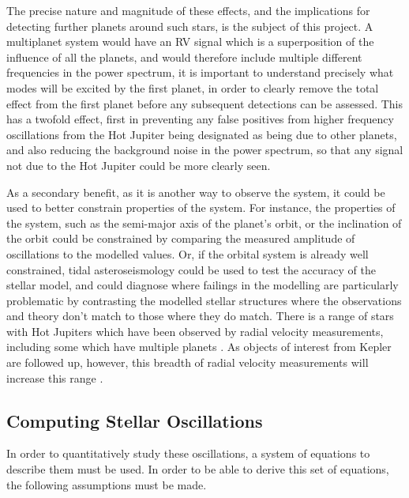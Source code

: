 \documentclass[11pt]{amsart}
\begin{document}
The precise nature and magnitude of these effects, and the implications for detecting further planets around such stars, is the subject of this project.  A multiplanet system would have an RV signal which is a superposition of the influence of all the planets, and would therefore include multiple different frequencies in the power spectrum, it is important to understand precisely what modes will be excited by the first planet, in order to clearly remove the total effect from the first planet before any subsequent detections can be assessed.  This has a twofold effect, first in preventing any false positives from higher frequency oscillations from the Hot Jupiter being designated as being due to other planets, and also reducing the background noise in the power spectrum, so that any signal not due to the Hot Jupiter could be more clearly seen.

As a secondary benefit, as it is another way to observe the system, it could be used to better constrain properties of the system.  For instance, the properties of the system, such as the semi-major axis of the planet's orbit, or the inclination of the orbit could be constrained by comparing the measured amplitude of oscillations to the modelled values.  Or, if the orbital system is already well constrained, tidal asteroseismology could be used to test the accuracy of the stellar model, and could diagnose where failings in the modelling are particularly problematic by contrasting the modelled stellar structures where the observations and theory don't match to those where they do match.  There is a range of stars with Hot Jupiters which have been observed by radial velocity measurements, including some which have multiple planets \cite{NASAExoplanet}.  As objects of interest from Kepler are followed up, however, this  breadth of radial velocity measurements will increase this range \cite{Crouzet2017}.




\subsection{Computing Stellar Oscillations} \label{Intro:StellarOsc}

In order to quantitatively study these oscillations, a system of equations to describe them must be used.  In order to be able to derive this set of equations, the following assumptions must be made.
\end{document}
